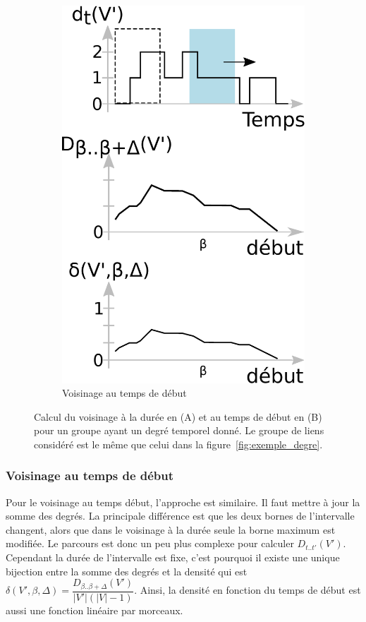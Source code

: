 \begin{figure}
\begin{subfigure}{0.4\textwidth}
		\includegraphics[width=0.8\linewidth]{img/GroupeDense/start_time.eps}
		\caption{Voisinage au temps de début}
		\label{fig:calcul_var_debut}
	\end{subfigure}\hspace*{0.05cm}

	\caption{Calcul du voisinage à la durée en (A) et au temps de début en (B) pour un groupe ayant un degré temporel donné. Le groupe de liens considéré est le même que celui dans la figure~\ref{fig:exemple_degre}.}
	\label{fig:calcul_var_dure_debut.}
\end{figure}

\subsubsection{Voisinage au temps de début}
Pour le voisinage au temps début, l'approche est similaire.
Il faut mettre à jour la somme des degrés.
La principale différence est que les deux bornes de l'intervalle changent, alors que dans le voisinage à la durée seule la borne maximum est modifiée.
Le parcours est donc un peu plus complexe pour calculer $D_{t..t'}(V')$.
Cependant la durée de l'intervalle est fixe, c'est pourquoi il existe une unique bijection entre la somme des degrés et la densité qui est $\delta(V',\beta, \Delta)= \dfrac{D_{\beta..\beta+\Delta}(V')}{|V'|(|V|-1)}$.
Ainsi, la densité en fonction du temps de début est aussi une fonction linéaire par morceaux.

